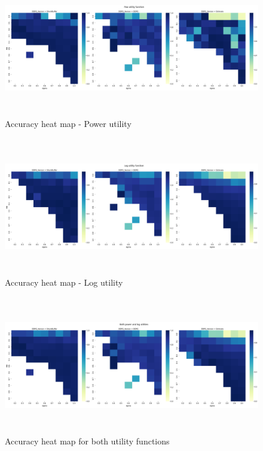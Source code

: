 \begin{figure}[htpb]
  \includegraphics[width=1\textwidth,height=6cm]{figures/Results/Heatmap1.png}
  \caption[Accuracy heat map - Power utility]{Accuracy heat map - Power utility} \label{fig:results:AHMPU}
\end{figure}
\begin{figure}[htpb]
    \includegraphics[width=1\textwidth,height=6cm]{figures/Results/Heatmaplog.png}
  \caption[Accuracy heat map - Log]{Accuracy heat map - Log utility} \label{fig:results:AHMLU}
\end{figure}
\begin{figure}[htpb]
    \includegraphics[width=1\textwidth,height=6cm]{figures/Results/heatmap_both.png}
  \caption[Accuracy heat map - All]{Accuracy heat map for both utility functions} \label{fig:results:AHMA}
\end{figure}

